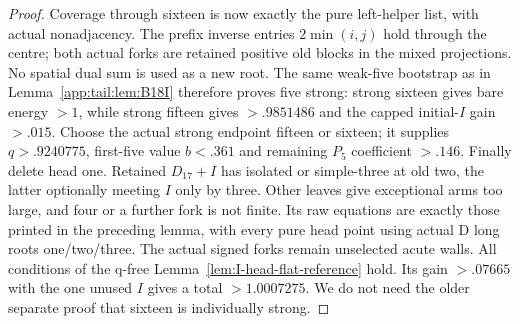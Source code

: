 \begin{proof}
Coverage through sixteen is now exactly the pure left-helper
list, with actual nonadjacency. The prefix inverse entries
$2\min(i,j)$ hold through the centre; both actual forks are
retained positive old blocks in the mixed projections.
No spatial dual sum is used as a new root.
The same weak-five bootstrap as in Lemma~\ref{app:tail:lem:B18I}
therefore proves five strong: strong sixteen gives bare energy
$>1$, while strong fifteen gives $>.9851486$ and the capped
initial-$I$ gain $>.015$.
Choose the actual strong endpoint fifteen or sixteen; it
supplies $q>.9240775$, first-five value $b<.361$ and remaining
$P_5$ coefficient $>.146$.
Finally delete head one. Retained $D_{17}+I$ has isolated
or simple-three at old two, the latter optionally meeting
$I$ only by three. Other leaves give exceptional arms too
large, and four or a further fork is not finite.
Its raw equations are exactly those printed in the preceding
lemma, with every pure head point using actual D long roots
one/two/three. The actual signed forks remain unselected
acute walls. All conditions of the q-free
Lemma~\ref{lem:I-head-flat-reference} hold.
Its gain $>.07665$ with the one unused $I$ gives a total
$>1.0007275$. We do not need the older separate proof that
sixteen is individually strong.
\end{proof}

